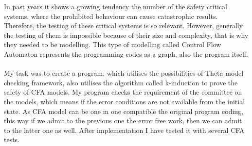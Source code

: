 In past years it shows a growing tendency the number of the safety critical systems, where the prohibited behaviour can cause catastrophic results. Therefore, the testing of these critical systems is so relevant. However, generally the testing of them is impossible because of their size and complexity, that is why they needed to be modelling. This type of modelling called Control Flow Automaton represents the programming codes as a graph, also the program itself. 
\\
\\
My task was to create a program, which utilises the possibilities of Theta model checking framework, also utilises the algorithm called k-induction to prove the safety of CFA models. My program checks the requirement of the committee on the models, which means if the error conditions are not available from the initial state. As CFA model can be one in one compatible the original program coding, this way if we admit to the previous one the error free work, then we can admit to the latter one as well. After implementation I have tested it with several CFA tests.

\vfill
\cleardoublepage

\selectthesislanguage

\setcounter{romanPage}{\value{page}}
